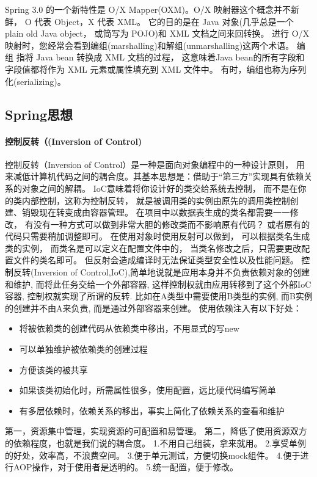 \documentclass{book}
\begin{document}
Spring 3.0 的一个新特性是 O/X Mapper(OXM)。O/X 映射器这个概念并不新鲜，
O 代表 Object，X 代表 XML。
它的目的是在 Java 对象(几乎总是一个 plain old Java object，
或简写为 POJO)和 XML 文档之间来回转换。
进行 O/X 映射时，您经常会看到编组(marshalling)和解组(unmarshalling)这两个术语。
编组 指将 Java bean 转换成 XML 文档的过程，
这意味着Java bean的所有字段和字段值都将作为 XML 元素或属性填充到 XML 文件中。
有时，编组也称为序列化(serializing)。

\subsection{Spring思想}

\paragraph{控制反转（(Inversion of Control)}

控制反转（Inversion of Control）是一种是面向对象编程中的一种设计原则，
用来减低计算机代码之间的耦合度。其基本思想是：借助于“第三方”实现具有依赖关系的对象之间的解耦。
IoC意味着将你设计好的类交给系统去控制，
而不是在你的类内部控制，这称为控制反转，
就是被调用类的实例由原先的调用类控制创建、销毁现在转变成由容器管理。
在项目中以数据表生成的类名都需要一一修改，
有没有一种方式可以做到非常大胆的修改类而不影响原有代码？
或者原有的代码只需要稍加调整即可。
在使用对象时使用反射可以做到，
可以根据类名生成类的实例，
而类名是可以定义在配置文件中的，
当类名修改之后，只需要更改配置文件的类名即可。
但反射会造成编译时无法保证类型安全性以及性能问题。
控制反转(Inversion of Control,IoC),简单地说就是应用本身并不负责依赖对象的创建和维护,
而将此任务交给一个外部容器,
这样控制权就由应用转移到了这个外部IoC容器,
控制权就实现了所谓的反转.
比如在A类型中需要使用B类型的实例,
而B实例的创建并不由A来负责,
而是通过外部容器来创建。
使用依赖注入有以下好处：

\begin{itemize}
	\item{将被依赖类的创建代码从依赖类中移出，不用显式的写new}
	\item{可以单独维护被依赖类的创建过程}
	\item{方便该类的被共享}
	\item{如果该类初始化时，所需属性很多，使用配置，远比硬代码编写简单}
	\item{有多层依赖时，依赖关系的移出，事实上简化了依赖关系的查看和维护}
\end{itemize}

第一，资源集中管理，实现资源的可配置和易管理。
第二，降低了使用资源双方的依赖程度，也就是我们说的耦合度。
1.不用自己组装，拿来就用。
2.享受单例的好处，效率高，不浪费空间。
3.便于单元测试，方便切换mock组件。
4.便于进行AOP操作，对于使用者是透明的。
5.统一配置，便于修改。
\end{document}
